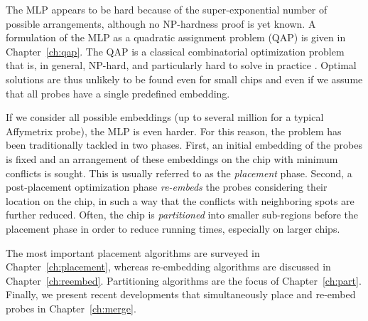 The MLP appears to be hard because of the super-exponential number of possible
arrangements, although no NP-hardness proof is yet known. A formulation of the
MLP as a quadratic assignment problem (QAP) is given in Chapter~\ref{ch:qap}.
The QAP is a classical combinatorial optimization problem that is, in general,
NP-hard, and particularly hard to solve in practice \citep{Cela1997}. Optimal
solutions are thus unlikely to be found even for small chips and even if we
assume that all probes have a single predefined embedding.

If we consider all possible embeddings (up to several million for a typical
Affymetrix probe), the MLP is even harder. For this reason, the problem has been
traditionally tackled in two phases. First, an initial embedding of the probes
is fixed and an arrangement of these embeddings on the chip with minimum
conflicts is sought. This is usually referred to as the \emph{placement} phase.
Second, a post-placement optimization phase \emph{re-embeds} the probes
considering their location on the chip, in such a way that the conflicts with
neighboring spots are further reduced. Often, the chip is \emph{partitioned}
into smaller sub-regions before the placement phase in order to reduce running
times, especially on larger chips.

The most important placement algorithms are surveyed in
Chapter~\ref{ch:placement}, whereas re-embedding algorithms are discussed in
Chapter~\ref{ch:reembed}. Partitioning algorithms are the focus of
Chapter~\ref{ch:part}. Finally, we present recent developments that
simultaneously place and re-embed probes in Chapter~\ref{ch:merge}.
